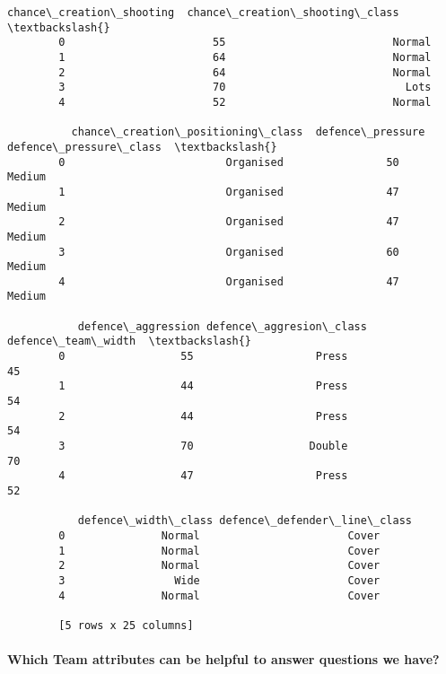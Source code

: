 \documentclass[11pt]{article}
\begin{document}
\begin{Verbatim}[commandchars=\\\{\}]
          chance\_creation\_shooting  chance\_creation\_shooting\_class  \textbackslash{}
        0                       55                          Normal   
        1                       64                          Normal   
        2                       64                          Normal   
        3                       70                            Lots   
        4                       52                          Normal   
        
          chance\_creation\_positioning\_class  defence\_pressure defence\_pressure\_class  \textbackslash{}
        0                         Organised                50                 Medium   
        1                         Organised                47                 Medium   
        2                         Organised                47                 Medium   
        3                         Organised                60                 Medium   
        4                         Organised                47                 Medium   
        
           defence\_aggression defence\_aggresion\_class defence\_team\_width  \textbackslash{}
        0                  55                   Press                 45   
        1                  44                   Press                 54   
        2                  44                   Press                 54   
        3                  70                  Double                 70   
        4                  47                   Press                 52   
        
           defence\_width\_class defence\_defender\_line\_class  
        0               Normal                       Cover  
        1               Normal                       Cover  
        2               Normal                       Cover  
        3                 Wide                       Cover  
        4               Normal                       Cover  
        
        [5 rows x 25 columns]
\end{Verbatim}
            
    \hypertarget{which-team-attributes-can-be-helpful-to-answer-questions-we-have}{%
\paragraph{Which Team attributes can be helpful to answer questions we
have?}\label{which-team-attributes-can-be-helpful-to-answer-questions-we-have}}
\end{document}
